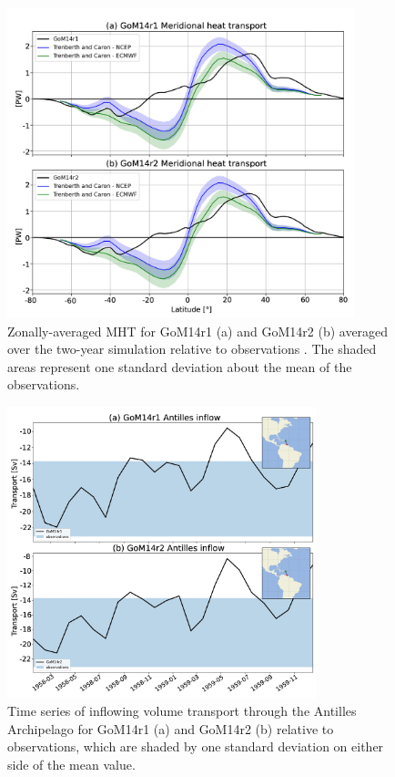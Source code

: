 \begin{figure}[h]
\centerline{\includegraphics[width=0.9\textwidth]{figures/scgsr/mht_gom14.jpg}}
    \caption{Zonally-averaged MHT for GoM14r1 (a) and GoM14r2 (b) averaged over the two-year simulation relative to observations \citep[see][]{trenberth2001estimates}. The shaded areas represent one standard deviation about the mean of the observations.}
    \label{fig:mht}
\end{figure}

\begin{figure}[h]
\centerline{\includegraphics[width=0.8\textwidth]{figures/scgsr/antilles_inflow.jpg}}
    \caption{Time series of inflowing volume transport through the Antilles Archipelago for GoM14r1 (a) and GoM14r2 (b) relative to observations, which are shaded by one standard deviation on either side of the mean value.}
    \label{fig:antilles}
\end{figure}

